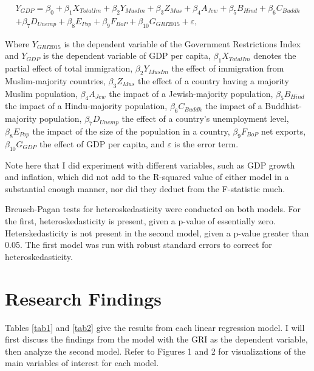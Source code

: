 \documentclass[12pt,english]{article}
\begin{document}
\begin{multline}
\label{eq:1}
Y_{GDP}=\beta_{0} + \beta_{1}X_{TotalIm} + \beta_{2} Y_{MusIm} + \beta_{3} Z_{Mus} + \beta_{4}A_{Jew} + \beta_{5}B_{Hind} + \beta_{6}C_{Buddh} \\ + \beta_{7}D_{Unemp} + \beta_{8}E_{Pop} + \beta_{9}F_{BoP} + \beta_{10}G_{GRI2015} + \varepsilon,
\end{multline}


Where $Y_{GRI2015}$ is the dependent variable of the Government Restrictions Index and $Y_{GDP}$ is the dependent variable of GDP per capita, $\beta_{1}X_{TotalIm}$ denotes the partial effect of total immigration, $\beta_{2} Y_{MusIm}$ the effect of immigration from Muslim-majority countries, $\beta_{3} Z_{Mus}$ the effect of a country having a majority Muslim population, $\beta_{4}A_{Jew}$ the impact of a Jewish-majority population, $\beta_{5}B_{Hind}$ the impact of a Hindu-majority population, $\beta_{6}C_{Buddh}$ the impact of a Buddhist-majority population, $\beta_{7}D_{Unemp}$ the effect of a country's unemployment level, $\beta_{8}E_{Pop}$ the impact of the size of the population in a country, $\beta_{9}F_{BoP}$ net exports, $\beta_{10}G_{GDP}$ the effect of GDP per capita, and $\varepsilon$ is the error term.

Note here that I did experiment with different variables, such as GDP growth and inflation, which did not add to the R-squared value of either model in a substantial enough manner, nor did they deduct from the F-statistic much. 

Breusch-Pagan tests for heteroskedasticity were conducted on both models. For the first, heteroskedasticity is present, given a p-value of essentially zero. Heterskedasticity is not present in the second model, given a p-value greater than 0.05. The first model was run with robust standard errors to correct for heteroskedasticity.

\section{Research Findings}
Tables \ref{tab1} and \ref{tab2} give the results from each linear regression model. I will first discuss the findings from the model with the GRI as the dependent variable, then analyze the second model. Refer to Figures 1 and 2 for visualizations of the main variables of interest for each model.
\end{document}
